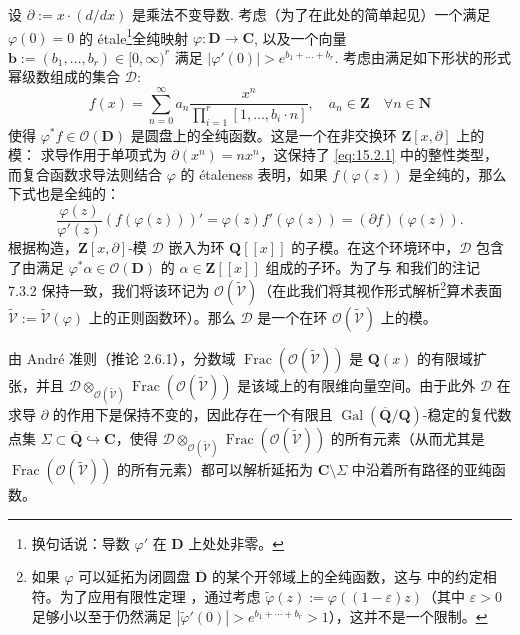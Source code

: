 设 \(\partial := x \cdot (d/dx)\) 是乘法不变导数. 
考虑（为了在此处的简单起见）一个满足 \(\varphi(0) = 0\) 的 {\'e}tale\footnote{换句话说：导数 $\varphi'$ 在 $\mathbf{D}$ 上处处非零。}全纯映射 \(\varphi : \mathbf{D} \to \mathbf{C}\), 
以及一个向量 \(\mathbf{b} := (b_1, \dots, b_r) \in [0, \infty)^r\) 
满足 \(|\varphi'(0)| > e^{b_1 + \dots + b_r}\). 
考虑由满足如下形状的形式幂级数组成的集合 \(\mathcal{D}\):
\begin{equation}\label{eq:15.2.1}
f(x) = \sum_{n=0}^{\infty} a_n \frac{x^n}{\prod_{i=1}^r [1,\dots,b_i \cdot n]}, \quad a_n \in \mathbf{Z} \quad \forall n \in \mathbf{N}
\end{equation}
使得 \(\varphi^* f \in \mathcal{O}(\mathbf{D})\) 是圆盘上的全纯函数。这是一个在非交换环 \(\mathbf{Z}[x,\partial]\) 上的模：
求导作用于单项式为 \(\partial(x^n) = nx^n\)，这保持了 \eqref{eq:15.2.1} 中的整性类型，而复合函数求导法则结合 \(\varphi\) 的 étaleness 表明，如果 \(f(\varphi(z))\) 是全纯的，那么下式也是全纯的：
\[ \frac{\varphi(z)}{\varphi'(z)} \left( f(\varphi(z)) \right)' = \varphi(z) f'(\varphi(z)) = (\partial f)(\varphi(z)). \]
根据构造，\(\mathbf{Z}[x,\partial]\)-模 \(\mathcal{D}\) 嵌入为环 \(\mathbf{Q}[\![x]\!]\) 的子模。在这个环境环中，\(\mathcal{D}\) 包含了由满足 \(\varphi^*\alpha \in \mathcal{O}(\mathbf{D})\) 的 \(\alpha \in \mathbf{Z}[\![x]\!]\) 组成的子环。为了与 \cite{BC22} 和我们的注记 7.3.2 保持一致，我们将该环记为 \(\mathcal{O}(\widetilde{\mathcal{V}})\)（在此我们将其视作形式解析\footnote{如果 $\varphi$ 可以延拓为闭圆盘 $\overline{\mathbf{D}}$ 的某个开邻域上的全纯函数，这与 \cite{BC22} 中的约定相符。为了应用有限性定理 \cite[定理 9.1.1]{BC22}，通过考虑 $\widetilde{\varphi}(z) := \varphi((1-\varepsilon)z)$（其中 $\varepsilon > 0$ 足够小以至于仍然满足 $|\widetilde{\varphi}'(0)| > e^{b_1 + \cdots + b_r} > 1$），这并不是一个限制。}算术表面 \(\widetilde{\mathcal{V}} := \widetilde{\mathcal{V}}(\varphi)\) 上的正则函数环）。那么 \(\mathcal{D}\) 是一个在环 \(\mathcal{O}(\widetilde{\mathcal{V}})\) 上的模。

由 Andr{\'e} 准则（推论 2.6.1），分数域 \(\operatorname{Frac}(\mathcal{O}(\widetilde{\mathcal{V}}))\) 是 \(\mathbf{Q}(x)\) 的有限域扩张，并且 \(\mathcal{D} \otimes_{\mathcal{O}(\widetilde{\mathcal{V}})} \operatorname{Frac}(\mathcal{O}(\widetilde{\mathcal{V}}))\) 是该域上的有限维向量空间。由于此外 \(\mathcal{D}\) 在求导 \(\partial\) 的作用下是保持不变的，因此存在一个有限且 \(\operatorname{Gal}(\overline{\mathbf{Q}}/\mathbf{Q})\)-稳定的复代数点集 \(\Sigma \subset \overline{\mathbf{Q}} \hookrightarrow \mathbf{C}\)，使得 \(\mathcal{D} \otimes_{\mathcal{O}(\widetilde{\mathcal{V}})} \operatorname{Frac}(\mathcal{O}(\widetilde{\mathcal{V}}))\) 的所有元素（从而尤其是 \(\operatorname{Frac}(\mathcal{O}(\widetilde{\mathcal{V}}))\) 的所有元素）都可以解析延拓为 \(\mathbf{C} \setminus \Sigma\) 中沿着所有路径的亚纯函数。


